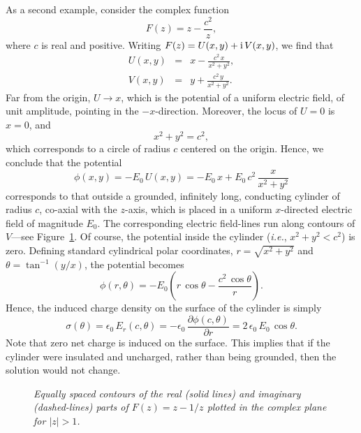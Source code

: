 As a second example, consider the complex function
\begin{equation}
F(z) = z - \frac{c^2}{z},
\end{equation}
where $c$ is real and positive. Writing $F(z)=U(x,y) + {\rm i}\,V(x,y)$, we find that
\begin{eqnarray}
U(x,y) &=& x - \frac{c^2\,x}{x^2+y^2},\\[0.5ex]
V(x,y) &=& y + \frac{c^2\,y}{x^2+y^2}.
\end{eqnarray}
Far from the origin, $U\rightarrow x$, which is the potential of a
uniform electric field, of unit amplitude, pointing in the $-x$-direction. 
Moreover, the locus
of $U=0$ is  $x=0$, and
\begin{equation}
x^2+y^2 = c^2,
\end{equation}
which corresponds to a circle of radius $c$ centered on the origin. Hence,
we conclude that the potential
\begin{equation}
\phi(x,y) = - E_0\,U(x,y) = -E_0\,x + E_0\,c^2\,\frac{x}{x^2+y^2}
\end{equation}
corresponds to that outside a grounded, infinitely long,  conducting cylinder of radius $c$, co-axial with the $z$-axis, which is placed in a uniform $x$-directed electric field of
magnitude $E_0$. The corresponding electric field-lines run along
contours of $V$---see Figure~\ref{ff6}.
Of course, the potential inside the cylinder ({\em i.e.},
$x^2+y^2< c^2$) is zero. Defining standard cylindrical polar coordinates,
$r=\sqrt{x^2+y^2}$ and $\theta =\tan^{-1}(y/x)$, the
potential becomes
\begin{equation}
\phi(r,\theta) = - E_0\left(r\,\cos\theta - \frac{c^2\,\cos\theta}{r}\right).
\end{equation}
Hence, the induced charge density on the surface of
the cylinder is simply
\begin{equation}
\sigma(\theta) = \epsilon_0\,E_r(c,\theta) = - \epsilon_0\,\frac{\partial\phi(c,\theta)}{\partial r} =
2\,\epsilon_0\,E_0\,\cos\theta.
\end{equation}
 Note that zero
net charge is induced on the surface. This implies that if the cylinder were
insulated and uncharged, rather than being grounded, then the solution would not change.
\begin{figure}
\epsfysize=3in
\centerline{}
\caption{\em Equally spaced contours of the real (solid lines) and imaginary (dashed-lines) parts of $F(z)=z - 1/z$ plotted in the complex plane for $|z|>1$. }\label{ff6}
\end{figure}

